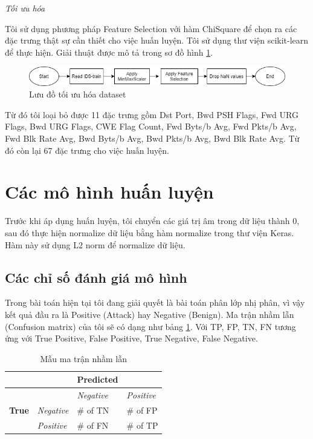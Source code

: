\textit{Tối ưu hóa}

Tôi sử dụng phương pháp Feature Selection với hàm ChiSquare để chọn ra các đặc trưng thật sự cần thiết cho việc huấn luyện.
Tôi sử dụng thư viện scikit-learn để thực hiện. Giải thuật được mô tả trong sơ đồ hình \ref{fig:feature-selection}.

\begin{figure}[ht!]
	\centering
	\includegraphics[width=\linewidth]{fig/feature-selection.png}
	\caption{Lưu đồ tối ưu hóa dataset}
	\label{fig:feature-selection}
\end{figure}

Từ đó tôi loại bỏ được 11 đặc trưng gồm Dst Port, Bwd PSH Flags, Fwd URG Flags, Bwd URG Flags, CWE Flag Count, Fwd Byts/b Avg, Fwd Pkts/b Avg, Fwd Blk Rate Avg, Bwd Byts/b Avg, Bwd Pkts/b Avg, Bwd Blk Rate Avg. Từ đó còn lại 67 đặc trưng cho việc huấn luyện.

\section{Các mô hình huấn luyện}

Trước khi áp dụng huấn luyện, tôi chuyển các giá trị âm trong dữ liệu thành 0, sau đó thực hiện normalize dữ liệu bằng hàm normalize trong thư viện Keras. Hàm này sử dụng L2 norm để normalize dữ liệu.

\subsection{Các chỉ số đánh giá mô hình}

Trong bài toán hiện tại tôi đang giải quyết là bài toán phân lớp nhị phân, vì vậy kết quả đầu ra là Positive (Attack) hay Negative (Benign).
Ma trận nhầm lẫn (Confusion matrix) của tôi sẽ có dạng như bảng \ref{tab:confusion_matrix_pattern}. Với TP, FP, TN, FN tương ứng với True Positive, False Positive, True Negative, False Negative.

\begin{table}[ht!]
\centering
	\begin{tabular}{|l|l|l|l|}
		\hline
		&                   & \textbf{Predicted} &                   \\ \hline
		&                   & \textit{Negative}  & \textit{Positive} \\ \hline
		\textbf{True} & \textit{Negative} & \# of TN           & \# of FP          \\ \hline
		& \textit{Positive} & \# of FN           & \# of TP          \\ \hline
	\end{tabular}
\caption{Mẫu ma trận nhầm lẫn}
\label{tab:confusion_matrix_pattern}
\end{table}

